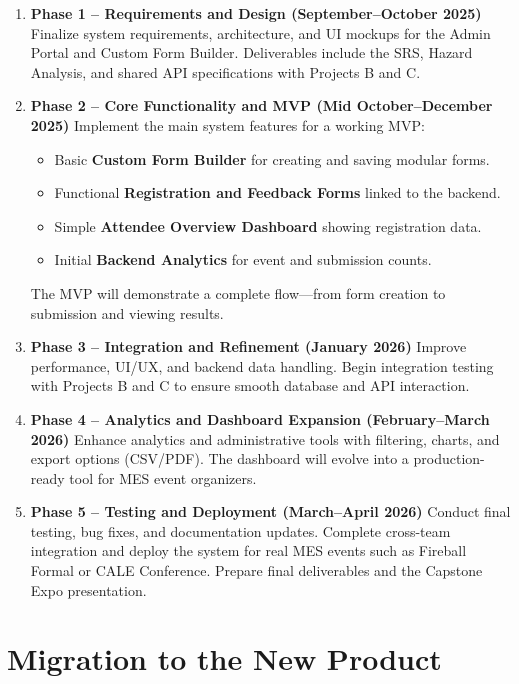 \documentclass[12pt]{article}
\begin{document}
\begin{enumerate}
    \item \textbf{Phase 1 – Requirements and Design (September–October 2025)}
    Finalize system requirements, architecture, and UI mockups for the Admin Portal and Custom Form Builder.
    Deliverables include the SRS, Hazard Analysis, and shared API specifications with Projects B and C.

    \item \textbf{Phase 2 – Core Functionality and MVP (Mid October–December 2025)}
    Implement the main system features for a working MVP:
    \begin{itemize}
        \item Basic \textbf{Custom Form Builder} for creating and saving modular forms.
        \item Functional \textbf{Registration and Feedback Forms} linked to the backend.
        \item Simple \textbf{Attendee Overview Dashboard} showing registration data.
        \item Initial \textbf{Backend Analytics} for event and submission counts.
    \end{itemize}
    The MVP will demonstrate a complete flow—from form creation to submission and viewing results.

    \item \textbf{Phase 3 – Integration and Refinement (January 2026)}
    Improve performance, UI/UX, and backend data handling.
    Begin integration testing with Projects B and C to ensure smooth database and API interaction.

    \item \textbf{Phase 4 – Analytics and Dashboard Expansion (February–March 2026)}
    Enhance analytics and administrative tools with filtering, charts, and export options (CSV/PDF).
    The dashboard will evolve into a production-ready tool for MES event organizers.

    \item \textbf{Phase 5 – Testing and Deployment (March–April 2026)}
    Conduct final testing, bug fixes, and documentation updates.
    Complete cross-team integration and deploy the system for real MES events such as Fireball Formal or CALE Conference.
    Prepare final deliverables and the Capstone Expo presentation.
\end{enumerate}

\section{Migration to the New Product}
\end{document}
